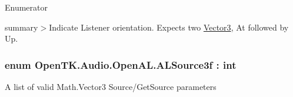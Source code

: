 \begin{Desc}
\item[Enumerator]\par
\begin{description}
\item[{\em 
\hypertarget{namespace_open_t_k_1_1_audio_1_1_open_a_l_a3efa5ef6cd34b51a9c1bb311a40e9b12aabbd64f40c34c537d3a571af068fce29}{Orientation}\label{namespace_open_t_k_1_1_audio_1_1_open_a_l_a3efa5ef6cd34b51a9c1bb311a40e9b12aabbd64f40c34c537d3a571af068fce29}
}]summary$>$Indicate Listener orientation. Expects two \hyperlink{struct_open_t_k_1_1_vector3}{Vector3}, At followed by Up.\end{description}
\end{Desc}
\hypertarget{namespace_open_t_k_1_1_audio_1_1_open_a_l_a6c1ca07b104dd956910ef7cc10caa9ec}{
\subsubsection[{A\-L\-Source3f}]{\setlength{\rightskip}{0pt plus 5cm}enum {\bf Open\-T\-K.\-Audio.\-Open\-A\-L.\-A\-L\-Source3f} \-: int}}\label{namespace_open_t_k_1_1_audio_1_1_open_a_l_a6c1ca07b104dd956910ef7cc10caa9ec}


A list of valid Math.\-Vector3 Source/\-Get\-Source parameters

